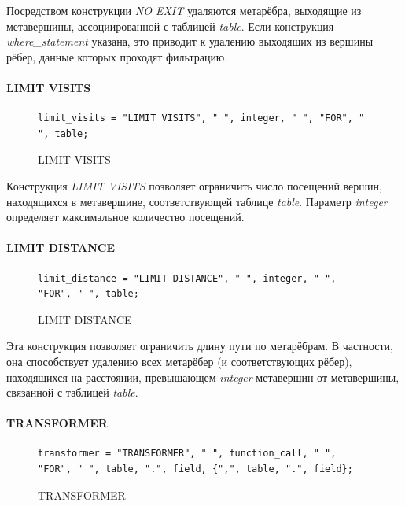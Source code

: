 Посредством конструкции \textit{NO EXIT} удаляются метарёбра, выходящие из метавершины, ассоциированной с таблицей \textit{table}. Если конструкция \textit{where\_statement} указана, это приводит к удалению выходящих из вершины рёбер, данные которых проходят фильтрацию.

\paragraph{LIMIT VISITS}

\begin{figure}
  \begin{lstlisting}
limit_visits = "LIMIT VISITS", " ", integer, " ", "FOR", " ", table;
  \end{lstlisting}
  \caption{LIMIT VISITS}
  \label{symbol-limit-visits}
\end{figure}

Конструкция \textit{LIMIT VISITS} позволяет ограничить число посещений вершин, находящихся в метавершине, соответствующей таблице \textit{table}. Параметр \textit{integer} определяет максимальное количество посещений.

\paragraph{LIMIT DISTANCE}

\begin{figure}
  \begin{lstlisting}
limit_distance = "LIMIT DISTANCE", " ", integer, " ", "FOR", " ", table;
  \end{lstlisting}
  \caption{LIMIT DISTANCE}
  \label{symbol-limit-distance}
\end{figure}

Эта конструкция позволяет ограничить длину пути по метарёбрам. В частности, она способствует удалению всех метарёбер (и соответствующих рёбер), находящихся на расстоянии, превышающем \textit{integer} метавершин от метавершины, связанной с таблицей \textit{table}.

\paragraph{TRANSFORMER}

\begin{figure}
  \begin{lstlisting}
transformer = "TRANSFORMER", " ", function_call, " ", "FOR", " ", table, ".", field, {",", table, ".", field};
  \end{lstlisting}
  \caption{TRANSFORMER}
  \label{symbol-transformer}
\end{figure}

